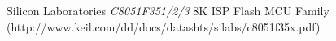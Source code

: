 \begin{thebibliography}{99}

 Silicon Laboratories \emph{C8051F351/2/3} 8K ISP Flash MCU Family (http://www.keil.com/dd/docs/datashts/silabs/c8051f35x.pdf)

\end{thebibliography}




